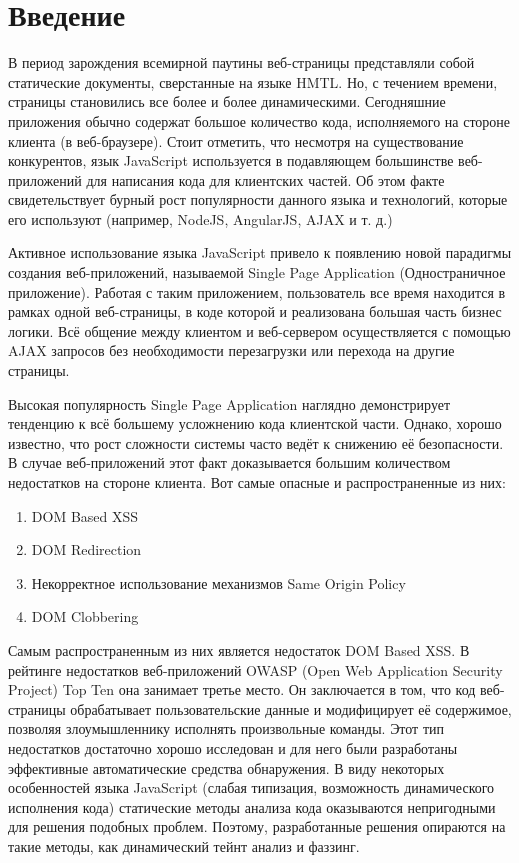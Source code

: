 
\chapter{Введение}\label{Introduction}

В период зарождения всемирной паутины веб-страницы представляли собой статические документы, сверстанные на языке HMTL. Но, с течением времени, страницы становились все более и более динамическими. Сегодняшние приложения обычно содержат большое количество кода, исполняемого на стороне клиента (в веб-браузере). Стоит отметить, что несмотря на существование конкурентов, язык JavaScript используется в подавляющем большинстве веб-приложений для написания кода для клиентских частей. Об этом факте свидетельствует бурный рост популярности данного языка и технологий, которые его используют (например, NodeJS, AngularJS, AJAX и т. д.)


Активное использование языка JavaScript привело к появлению новой парадигмы создания веб-приложений, называемой Single Page Application (Одностраничное приложение). Работая с таким приложением, пользователь все время находится в рамках одной веб-страницы, в коде которой и реализована большая часть бизнес логики. Всё общение между клиентом и веб-сервером осуществляется с помощью AJAX запросов без необходимости перезагрузки или перехода на другие страницы.


Высокая популярность Single Page Application наглядно демонстрирует тенденцию к всё большему усложнению кода клиентской части. Однако, хорошо известно, что рост сложности системы часто ведёт к снижению её безопасности. В случае веб-приложений этот факт доказывается большим количеством недостатков на стороне клиента. Вот самые опасные и распространенные из них:

\begin{enumerate}
	\item DOM Based XSS
	\item DOM Redirection
	\item Некорректное использование механизмов Same Origin Policy
	\item DOM Clobbering
\end{enumerate}


Самым распространенным из них является недостаток DOM Based XSS. В рейтинге недостатков веб-приложений OWASP (Open Web Application Security Project) Top Ten она занимает третье место. Он заключается в том, что код веб-страницы обрабатывает пользовательские данные и модифицирует её содержимое, позволяя злоумышленнику исполнять произвольные команды. Этот тип недостатков достаточно хорошо исследован и для него были разработаны эффективные автоматические средства обнаружения. В виду некоторых особенностей языка JavaScript (слабая типизация, возможность динамического исполнения кода) статические методы анализа кода оказываются непригодными для решения подобных проблем. Поэтому, разработанные решения опираются на такие методы, как динамический тейнт анализ и фаззинг.


